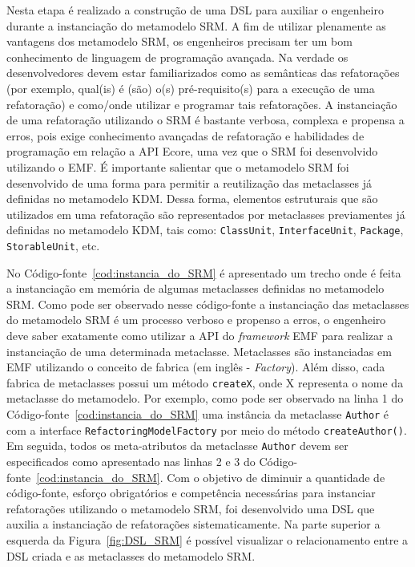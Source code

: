 Nesta etapa é realizado a construção de uma DSL para auxiliar o engenheiro durante a instanciação do metamodelo SRM. A fim de utilizar plenamente as vantagens dos metamodelo SRM, os engenheiros precisam ter um bom conhecimento de linguagem de programação avançada. Na verdade os desenvolvedores devem estar familiarizados como as semânticas das refatorações (por exemplo, qual(is) é (são) o(s) pré-requisito(s) para a execução de uma refatoração) e como/onde utilizar e programar tais refatorações. A instanciação de uma refatoração utilizando o SRM é bastante verbosa, complexa e propensa a erros, pois exige conhecimento avançadas de refatoração e habilidades de programação em relação a API Ecore, uma vez que o SRM foi desenvolvido utilizando o EMF. É importante salientar que o metamodelo SRM foi desenvolvido de uma forma para permitir a reutilização das metaclasses já definidas no metamodelo KDM. Dessa forma, elementos estruturais que são utilizados em uma refatoração são representados por metaclasses previamentes já definidas no metamodelo KDM, tais como: \texttt{ClassUnit}, \texttt{InterfaceUnit}, \texttt{Package}, \texttt{StorableUnit}, etc.


No Código-fonte~\ref{cod:instancia_do_SRM} é apresentado um trecho onde é feita a instanciação em memória de algumas metaclasses definidas no metamodelo SRM. Como pode ser observado nesse código-fonte a instanciação das metaclasses do metamodelo SRM é um processo verboso e propenso a erros, o engenheiro deve saber exatamente como utilizar a API do \textit{framework} EMF para realizar a instanciação de uma determinada metaclasse. Metaclasses são instanciadas em EMF utilizando o conceito de fabrica (em inglês - \textit{Factory}). Além disso, cada fabrica de metaclasses possui um método \texttt{createX}, onde X representa o nome da metaclasse do metamodelo. 
Por exemplo, como pode ser observado na linha 1 do Código-fonte~\ref{cod:instancia_do_SRM} uma instância da metaclasse \texttt{Author} é com a interface \texttt{RefactoringModelFactory} por meio do método \texttt{createAuthor()}. Em seguida, todos os meta-atributos da metaclasse \texttt{Author} devem ser especificados como apresentado nas linhas 2 e 3 do Código-fonte~\ref{cod:instancia_do_SRM}. Com o objetivo de diminuir a quantidade de código-fonte, esforço obrigatórios e competência necessárias para instanciar refatorações utilizando o metamodelo SRM, foi desenvolvido uma DSL que auxilia a instanciação de refatorações sistematicamente. Na parte superior a esquerda da Figura~\ref{fig:DSL_SRM} é possível visualizar o relacionamento entre a DSL criada e as metaclasses do metamodelo SRM.

